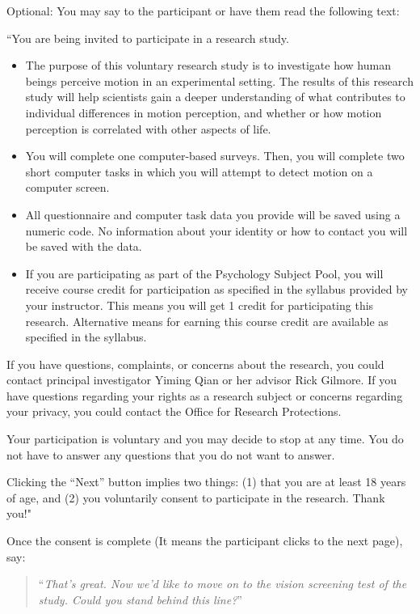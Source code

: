 \documentclass[]{article}
\providecommand{\tightlist}{%
  \setlength{\itemsep}{0pt}\setlength{\parskip}{0pt}}
\begin{document}
Optional: You may say to the participant or have them read the following
text:

``You are being invited to participate in a research study.

\begin{itemize}
\tightlist
\item
  The purpose of this voluntary research study is to investigate how
  human beings perceive motion in an experimental setting. The results
  of this research study will help scientists gain a deeper
  understanding of what contributes to individual differences in motion
  perception, and whether or how motion perception is correlated with
  other aspects of life.
\item
  You will complete one computer-based surveys. Then, you will complete
  two short computer tasks in which you will attempt to detect motion on
  a computer screen.
\item
  All questionnaire and computer task data you provide will be saved
  using a numeric code. No information about your identity or how to
  contact you will be saved with the data.
\item
  If you are participating as part of the Psychology Subject Pool, you
  will receive course credit for participation as specified in the
  syllabus provided by your instructor. This means you will get 1 credit
  for participating this research. Alternative means for earning this
  course credit are available as specified in the syllabus.
\end{itemize}

If you have questions, complaints, or concerns about the research, you
could contact principal investigator Yiming Qian or her advisor Rick
Gilmore. If you have questions regarding your rights as a research
subject or concerns regarding your privacy, you could contact the Office
for Research Protections.

Your participation is voluntary and you may decide to stop at any time.
You do not have to answer any questions that you do not want to answer.

Clicking the ``Next'' button implies two things: (1) that you are at
least 18 years of age, and (2) you voluntarily consent to participate in
the research. Thank you!"

Once the consent is complete (It means the participant clicks to the
next page), say:

\begin{quote}
``\emph{That's great. Now we'd like to move on to the vision screening
test of the study. Could you stand behind this line?}''
\end{quote}
\end{document}
